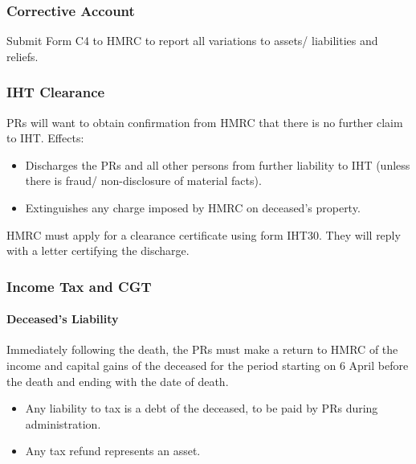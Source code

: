 \documentclass[
]{article}
\newenvironment{Shaded}{}{}
\newcommand{\NormalTok}[1]{#1}
\providecommand{\tightlist}{%
  \setlength{\itemsep}{0pt}\setlength{\parskip}{0pt}}
\begin{document}
\hypertarget{corrective-account}{%
\subsubsection{Corrective Account}\label{corrective-account}}

Submit Form C4 to HMRC to report all variations to assets/ liabilities
and reliefs.

\hypertarget{iht-clearance}{%
\subsubsection{IHT Clearance}\label{iht-clearance}}

PRs will want to obtain confirmation from HMRC that there is no further
claim to IHT. Effects:

\begin{itemize}
\tightlist
\item
  Discharges the PRs and all other persons from further liability to IHT
  (unless there is fraud/ non-disclosure of material facts).
\item
  Extinguishes any charge imposed by HMRC on deceased's property.
\end{itemize}

HMRC must apply for a clearance certificate using form IHT30. They will
reply with a letter certifying the discharge.

\hypertarget{income-tax-and-cgt}{%
\subsubsection{Income Tax and CGT}\label{income-tax-and-cgt}}

\hypertarget{deceaseds-liability}{%
\paragraph{Deceased's Liability}\label{deceaseds-liability}}

\begin{Shaded}
\begin{Highlighting}[]
\NormalTok{Immediately following the death, the PRs must make a return to HMRC of the income and capital gains of the deceased for the period starting on 6 April before the death and ending with the date of death.}
\end{Highlighting}
\end{Shaded}

\begin{itemize}
\tightlist
\item
  Any liability to tax is a debt of the deceased, to be paid by PRs
  during administration.
\item
  Any tax refund represents an asset.
\end{itemize}
\end{document}
